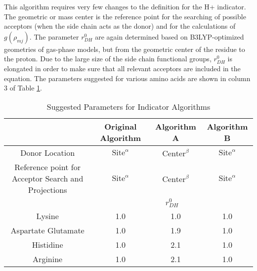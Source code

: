 \documentclass{article}
\newcommand{\mr}[1]{\mathrm{#1}}
\begin{document}
This algorithm requires very few changes to the definition for the H+ indicator.
The geometric or mass center is the reference point for the searching of possible acceptors (when the side chain acts as the donor) and for the calculations of $g(\rho_{mj})$.
The parameter $r^0_{DH}$ are again determined based on B3LYP-optimized geometries of gas-phase models, but from the geometric center of the residue to the proton.
Due to the large size of the side chain functional groups, $r^0_{DH}$ is elongated in order to make sure that all relevant acceptors are included in the equation.
The parameters suggested for various amino acids are shown in column 3 of Table \ref{tab:indparams}.

\begin{center}
\begin{table}\label{tab:indparams}
\caption{Suggested Parameters for Indicator Algorithms}
\begin{tabular}{c c c c}
\toprule
                    & Original Algorithm   & Algorithm A & Algorithm B \\
\midrule
Donor Location      & $\mr{Site}^\alpha$ & $\mr{Center}^\beta$ & $\mr{Site}^\alpha$           \\
Reference point for Acceptor Search and Projections & $\mr{Site}^\alpha$ & $\mr{Center}^\beta$ & $\mr{Site}^\alpha$           \\
 & \multicolumn{3}{c}{$r^0_{DH}$} \\
Lysine       & 1.0 & 1.0 & 1.0 \\
Aspartate Glutamate & 1.0 & 1.9 & 1.0 \\
Histidine & 1.0 & 2.1 & 1.0 \\
Arginine & 1.0 & 2.1 & 1.0 \\
\bottomrule
\end{tabular}
\end{table}
\end{center}
\end{document}
